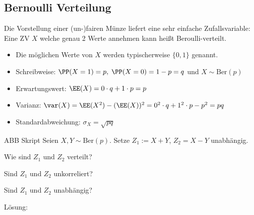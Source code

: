 \subsection{Bernoulli Verteilung}
Die Vorstellung einer (un-)fairen Münze liefert eine sehr einfache Zufallsvariable:
 Eine ZV $X$ welche genau 2 Werte annehmen kann heißt Beroulli-verteilt.
\begin{itemize}
\item Die möglichen Werte von $X$ werden typischerweise $\{0,1\}$ genannt.
\item Schreibweise: $\PP(X=1)=p, \; \PP(X=0)=1-p=q$ und $X \sim \mathrm{Ber}(p)$
\item Erwartungswert: $\EE(X)=0\cdot q + 1 \cdot p = p$
\item Varianz: $\var (X) = \EE(X^2) - (\EE(X))^2 = 0^2 \cdot q + 1^2 \cdot p - p^2 = pq$
\item Standardabweichung: $\sigma_X=\sqrt{pq}$
\end{itemize}
ABB Skript
 Seien $X,Y \sim \mathrm{Ber}(p)$. Setze $Z_1:= X+Y$, $Z_2=X-Y$ unabhängig.
\begin{anumerate}
\item Wie sind $Z_1$ und $Z_2$ verteilt?
\item Sind $Z_1$ und $Z_2$ unkorreliert?
\item Sind $Z_1$ und $Z_2$ unabhängig?
\end{anumerate}
Lösung:
